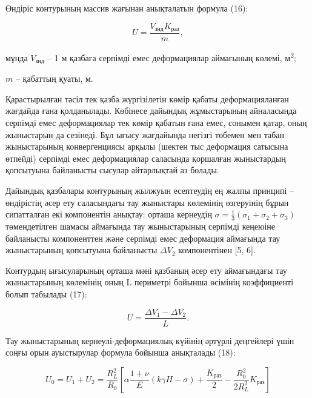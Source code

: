 \begin{multicols}{2}
Өндіріс контурының массив жағынан анықталатын формула (16):

\begin{equation}
U = \frac{V_{\text{знд}}K_{\text{раз}}}{m},
\end{equation}

мұнда \(V_{\text{знд}}\) -- 1 м қазбаға серпімді емес деформациялар аймағының
көлемі, м\textsuperscript{2};

\(m\) -- қабаттың қуаты, м.

Қарастырылған тәсіл тек қазба жүргізілетін көмір қабаты деформацияланған
жағдайда ғана қолданылады. Көбінесе дайындық жұмыстарының айналасында
серпімді емес деформациялар тек көмір қабатын ғана емес, сонымен қатар,
оның жыныстарын да сезінеді. Бұл ығысу жағдайында негізгі төбемен мен
табан жыныстарының конвергенциясы арқылы (шектен тыс деформация сатысына
өтпейді) серпімді емес деформациялар саласында қоршалған жыныстардың
қопсытуына байланысты сысулар айтарлықтай аз болады.

Дайындық қазбалары контурының жылжуын есептеудің ең жалпы принципі --
өндірістің әсер ету саласындағы тау жыныстары көлемінің өзгеруінің бұрын
сипатталған екі компонентін анықтау: орташа кернеудің
\(\sigma = \frac{1}{3}(\sigma_{1} + \sigma_{2} + \sigma_{3})\)
төмендетілген шамасы аймағында тау жыныстарының серпімді кеңеюіне
байланысты компоненттен және серпімді емес деформация аймағында тау
жыныстарының қопсытуына байланысты \(\Delta V_{2}\) компонентінен {[}5,
6{]}.

Контурдың ығысуларының орташа мәні қазбаның әсер ету аймағындағы тау
жыныстарының көлемінің оның L периметрі бойынша өсімінің коэффициенті
болып табылады (17):

\begin{equation}
U = \frac{\Delta V_{1} - \Delta V_{2}}{L}.
\end{equation}

Тау жыныстарының кернеулі-деформациялық күйінің әртүрлі деңгейлері үшін
соңғы орын ауыстырулар формула бойынша анықталады (18):
\end{multicols}

\begin{equation}
U_{0} = U_{1} + U_{2} = \frac{R_{L}^{2}}{R_{0}}\left\lbrack \alpha\frac{1 + \nu}{E}(k\gamma H - \sigma) + \frac{K_{\text{раз}}}{2} - \frac{R_{0}^{2}}{2R_{L}^{2}}K_{\text{раз}} \right\rbrack
\end{equation}

